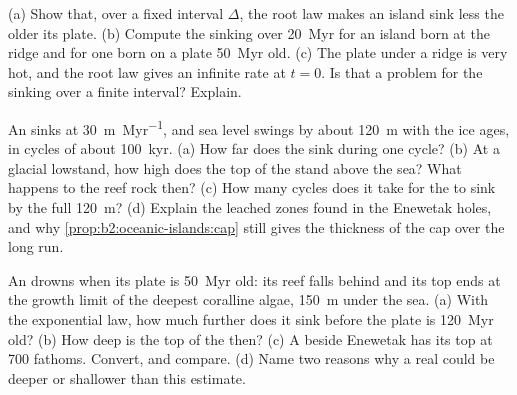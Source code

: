 \begin{exercise}[$\star\star\star$]\label{exo:b2:oceanic-islands:10}
(a) Show that, over a fixed interval $\Delta$, the root law makes an island sink less the older its
plate. (b) Compute the sinking over \qty{20}{Myr} for an island born at the ridge and for one born
on a plate \qty{50}{Myr} old. (c) The plate under a ridge is very hot, and the root law gives an
infinite rate at $t = 0$. Is that a problem for the sinking over a finite interval? Explain.
\end{exercise}

\begin{exercise}[$\star\star\star$]\label{exo:b2:oceanic-islands:11}
An  sinks at \qty{30}{m.Myr^{-1}}, and sea level swings by about \qty{120}{m} with the ice
ages, in cycles of about \qty{100}{kyr}. (a) How far does the  sink during one cycle? (b) At a
glacial lowstand, how high does the top of the  stand above the sea? What happens to the
reef rock then? (c) How many cycles does it take for the  to sink by the full \qty{120}{m}?
(d) Explain the leached zones found in the Enewetak holes, and why
\cref{prop:b2:oceanic-islands:cap} still gives the thickness of the cap over the long run.
\end{exercise}

\begin{exercise}[$\star\star\star$]\label{exo:b2:oceanic-islands:12}
An  drowns when its plate is \qty{50}{Myr} old: its reef falls behind and its top ends at the
growth limit of the deepest coralline algae, \qty{150}{m} under the sea. (a) With the exponential
law, how much further does it sink before the plate is \qty{120}{Myr} old? (b) How deep is the top
of the  then? (c) A  beside Enewetak has its top at 700 fathoms. Convert, and compare.
(d) Name two reasons why a real  could be deeper or shallower than this estimate.
\end{exercise}

